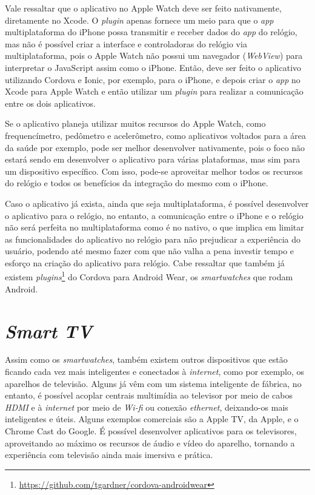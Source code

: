 Vale ressaltar que o aplicativo no Apple Watch deve ser feito nativamente, diretamente no Xcode. O \textit{plugin} apenas fornece um meio para que o \textit{app} multiplataforma do iPhone possa transmitir e receber 
dados do \textit{app} do relógio, mas não é possível criar a interface e controladoras do relógio via multiplataforma, pois o Apple Watch não possui um navegador (\textit{WebView}) para interpretar o JavaScript assim 
como o iPhone. Então, deve ser feito o aplicativo utilizando Cordova e Ionic, por exemplo, para o iPhone, e depois criar o \textit{app} no Xcode para Apple Watch e então utilizar um \textit{plugin} para realizar a 
comunicação entre os dois aplicativos.  

Se o aplicativo planeja utilizar muitos recursos do Apple Watch, como frequencímetro, pedômetro e acelerômetro, como aplicativos voltados para a área da saúde por exemplo, pode ser melhor desenvolver nativamente,
pois o foco não estará sendo em desenvolver o aplicativo para várias plataformas, mas sim para um dispositivo específico. Com isso, pode-se aproveitar melhor todos os recursos do relógio e todos os benefícios da integração
do mesmo com o iPhone.

Caso o aplicativo já exista, ainda que seja multiplataforma, é possível desenvolver o aplicativo para o relógio, no entanto, a comunicação entre o iPhone e o relógio não será perfeita no multiplataforma como é no nativo, 
o que implica em limitar as funcionalidades do aplicativo no relógio para não prejudicar a experiência do usuário, podendo até mesmo fazer com que não valha a pena investir tempo e esforço na criação do aplicativo para
relógio. Cabe ressaltar que também já existem \textit{plugins}\footnote{\url{https://github.com/tgardner/cordova-androidwear}} do Cordova para Android Wear, os \textit{smartwatches} que rodam Android.

\section{\textit{Smart TV}} \label{subsubsec:tv}
Assim como os \textit{smartwatches}, também existem outros dispositivos que estão ficando cada vez mais inteligentes e conectados à \textit{internet}, como por exemplo, os aparelhos de televisão. Alguns já vêm
com um sistema inteligente de fábrica, no entanto, é possível acoplar centrais multimídia ao televisor por meio de cabos \textit{HDMI} e à \textit{internet} por meio de \textit{Wi-fi} ou conexão \textit{ethernet}, 
deixando-os mais inteligentes e úteis. Alguns exemplos comerciais são a Apple TV, da Apple, e o Chrome Cast do Google. É possível desenvolver aplicativos para os televisores, aproveitando ao máximo os recursos de 
áudio e vídeo do aparelho, tornando a experiência com televisão ainda mais imersiva e prática. 

